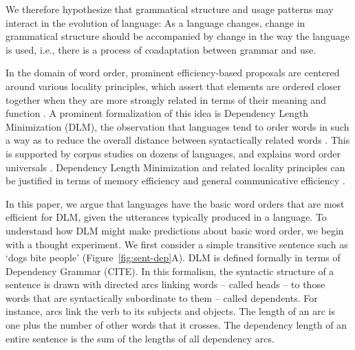 \documentclass[11pt,a4paper]{article}
\begin{document}

We therefore hypothesize that grammatical structure and usage patterns may interact in the evolution of language:
As a language changes, change in grammatical structure should be accompanied by change in the way the language is used, i.e., there is a process of {coadaptation} between grammar and use.

In the domain of word order, prominent efficiency-based proposals are centered around various locality principles, which assert that elements are ordered closer together when they are more strongly related in terms of their meaning and function \citep{behaghel1932deutsche,givon1985iconicity,rijkhoff-word-1986,hawkins-performance-1994}.
A prominent formalization of this idea is {Dependency Length Minimization} (DLM), the observation that languages tend to order words in such a way as to reduce the overall distance between syntactically related words \citep{rijkhoff-word-1986,hawkins-performance-1994,futrell-cross-linguistic-2015, liu-dependency-2017}.
This is supported by corpus studies on dozens of languages, and explains word order universals \citep{rijkhoff-word-1986, hawkins-performance-1994, hahn2020universals}.
Dependency Length Minimization and related locality principles can be justified in terms of memory efficiency \citep{gibson-linguistic-1998} and general communicative efficiency \citep{hahn2020universals}.

In this paper, we argue that languages have the basic word orders that are most efficient for DLM, given the utterances typically produced in a language.
To understand how DLM might make predictions about basic word order, we begin with a thought experiment.
We first consider a simple transitive sentence such as `dogs bite people' (Figure~\ref{fig:sent-dep}A). 
DLM is defined formally in terms of Dependency Grammar (CITE).
In this formalism, the syntactic structure of a sentence is drawn with directed arcs linking words -- called heads -- to those words that are syntactically subordinate to them -- called dependents.
For instance, arcs link the verb to its subjects and objects.
The length of an arc is one plus the number of other words that it crosses.
The dependency length of an entire sentence is the sum of the lengths of all dependency arcs.
\end{document}
